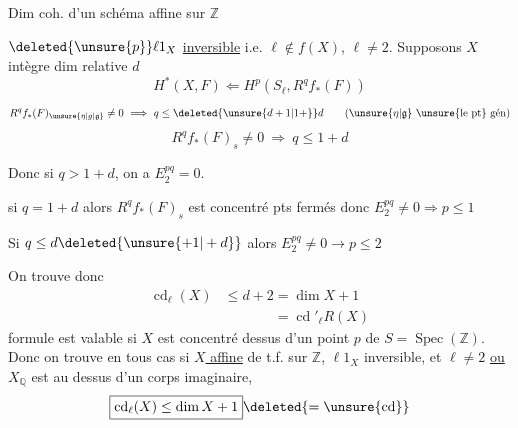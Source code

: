 Dim coh. d'un schéma affine sur $\mathbb Z$

$\deleted{\unsure{p}}\ell 1_X$ \uline{inversible} i.e. $\ell\notin f(X)$, \uline{$\ell\ne2$}.
Supposons  $X$ intègre  dim relative $d$
\[
H^*(X,F)\Longleftarrow H^p(S_{\ell},R^q f_*(F))
\]
\[
R^q f_*(F)_{\unsure{\eta|g|\mathfrak g}}\ne0\ \Longrightarrow\ q\leq\deleted{\unsure{d+1|1+}}d
\qquad(\unsure{\eta|\mathfrak g}\ \text{\unsure{le pt} gén})
\]
\[
R^q f_*(F)_s\ne0\ \Longrightarrow\ q\leq1+d
\]

Donc si $q>1+d$, on a $E_2^{pq}=0$. 

si $q=1+d$ alors $R^q f_*(F)_{s}$ est concentré  pts fermés
donc $E_2^{pq}\ne0\Longrightarrow p\leq1$

Si $q\leq d\deleted{\unsure{+1|+d}}$ alors $E_{2}^{pq}\ne0\longrightarrow p\leq2$


On trouve donc
\[
\begin{aligned}
\operatorname{cd}_{\ell}(X)&\leq d+2=\dim X+1\\
&\phantom{\leq d+2}=\operatorname{cd}'_{\ell}R(X)
\end{aligned}
\]
  formule est valable
si $X$ est concentré  dessus
d'un point $p$ de $S=\operatorname{Spec}(\mathbb Z)$. Donc on
trouve en tous cas si \uline{$X$ affine} de t.f. sur $\mathbb Z$,
$\ell 1_X$ inversible, et $\ell\ne2$ \uline{ou} $X_{\mathbb Q}$  est au
dessus d'un corps  imaginaire,
\[
\boxed{\operatorname{cd}_{\ell}(X)\leq\dim X+1}\deleted{=\unsure{\operatorname{cd}}}
\]

